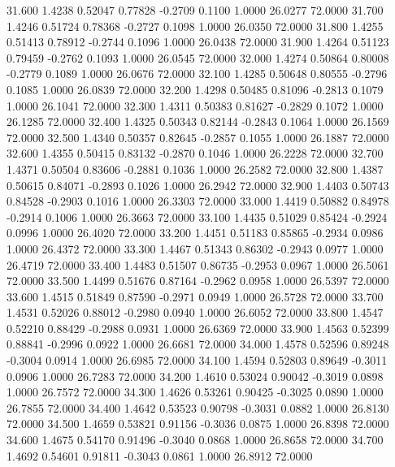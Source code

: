   31.600   1.4238   0.52047   0.77828  -0.2709   0.1100   1.0000  26.0277  72.0000
  31.700   1.4246   0.51724   0.78368  -0.2727   0.1098   1.0000  26.0350  72.0000
  31.800   1.4255   0.51413   0.78912  -0.2744   0.1096   1.0000  26.0438  72.0000
  31.900   1.4264   0.51123   0.79459  -0.2762   0.1093   1.0000  26.0545  72.0000
  32.000   1.4274   0.50864   0.80008  -0.2779   0.1089   1.0000  26.0676  72.0000
  32.100   1.4285   0.50648   0.80555  -0.2796   0.1085   1.0000  26.0839  72.0000
  32.200   1.4298   0.50485   0.81096  -0.2813   0.1079   1.0000  26.1041  72.0000
  32.300   1.4311   0.50383   0.81627  -0.2829   0.1072   1.0000  26.1285  72.0000
  32.400   1.4325   0.50343   0.82144  -0.2843   0.1064   1.0000  26.1569  72.0000
  32.500   1.4340   0.50357   0.82645  -0.2857   0.1055   1.0000  26.1887  72.0000
  32.600   1.4355   0.50415   0.83132  -0.2870   0.1046   1.0000  26.2228  72.0000
  32.700   1.4371   0.50504   0.83606  -0.2881   0.1036   1.0000  26.2582  72.0000
  32.800   1.4387   0.50615   0.84071  -0.2893   0.1026   1.0000  26.2942  72.0000
  32.900   1.4403   0.50743   0.84528  -0.2903   0.1016   1.0000  26.3303  72.0000
  33.000   1.4419   0.50882   0.84978  -0.2914   0.1006   1.0000  26.3663  72.0000
  33.100   1.4435   0.51029   0.85424  -0.2924   0.0996   1.0000  26.4020  72.0000
  33.200   1.4451   0.51183   0.85865  -0.2934   0.0986   1.0000  26.4372  72.0000
  33.300   1.4467   0.51343   0.86302  -0.2943   0.0977   1.0000  26.4719  72.0000
  33.400   1.4483   0.51507   0.86735  -0.2953   0.0967   1.0000  26.5061  72.0000
  33.500   1.4499   0.51676   0.87164  -0.2962   0.0958   1.0000  26.5397  72.0000
  33.600   1.4515   0.51849   0.87590  -0.2971   0.0949   1.0000  26.5728  72.0000
  33.700   1.4531   0.52026   0.88012  -0.2980   0.0940   1.0000  26.6052  72.0000
  33.800   1.4547   0.52210   0.88429  -0.2988   0.0931   1.0000  26.6369  72.0000
  33.900   1.4563   0.52399   0.88841  -0.2996   0.0922   1.0000  26.6681  72.0000
  34.000   1.4578   0.52596   0.89248  -0.3004   0.0914   1.0000  26.6985  72.0000
  34.100   1.4594   0.52803   0.89649  -0.3011   0.0906   1.0000  26.7283  72.0000
  34.200   1.4610   0.53024   0.90042  -0.3019   0.0898   1.0000  26.7572  72.0000
  34.300   1.4626   0.53261   0.90425  -0.3025   0.0890   1.0000  26.7855  72.0000
  34.400   1.4642   0.53523   0.90798  -0.3031   0.0882   1.0000  26.8130  72.0000
  34.500   1.4659   0.53821   0.91156  -0.3036   0.0875   1.0000  26.8398  72.0000
  34.600   1.4675   0.54170   0.91496  -0.3040   0.0868   1.0000  26.8658  72.0000
  34.700   1.4692   0.54601   0.91811  -0.3043   0.0861   1.0000  26.8912  72.0000
